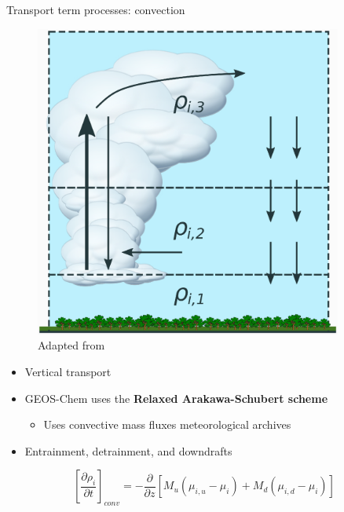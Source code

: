 \documentclass[10pt]{beamer}
\begin{document}
\begin{frame}[fragile]{Transport term processes: convection}
    \begin{minipage}[c]{0.5\textwidth}
        \begin{figure}
            \centering
            \includegraphics[width=0.9\textwidth]{box-model-convection.eps}
            \captionsetup{labelformat=empty}
            \caption{Adapted from \cite{brasseur_modeling_2017}}
        \end{figure}
    \end{minipage}
    \begin{minipage}[c]{0.49\textwidth}
        \begin{itemize}
            \item Vertical transport
            \vspace{4mm}
            \item GEOS-Chem uses the \textbf{Relaxed Arakawa-Schubert scheme}
            \vspace{4mm}
            \begin{itemize}
                \item Uses convective mass fluxes meteorological archives
            \end{itemize}
            \vspace{4mm}
            \item Entrainment, detrainment, and downdrafts
        \end{itemize}
    \end{minipage}
    $$
        \left[ \frac{\partial \rho_i}{\partial t} \right]_{conv} = - \frac{\partial}{\partial z} \left[M_u (\mu_{i,u} - \mu_{i}) + M_d (\mu_{i,d} - \mu_{i}) \right] 
    $$
\end{frame}
\end{document}
